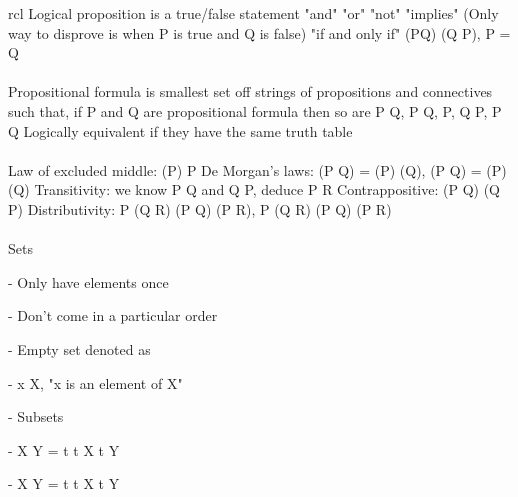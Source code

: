 \documentclass{article}
\begin{document}
\begin{arrary}{rcl}
Logical proposition is a true/false statement
\newline "and" \wedge
\newlilne "or" \vee
\newlline "not" \neg
\newline "implies" \Rightarrow (Only way to disprove is when P is true and Q is false)
\newlline "if and only if" \Leftrightarrow (P\Rightarrow Q) \wedge (Q \Rightarrow P), P = Q
\\
\\
Propositional formula is smallest set off strings of propositions and connectives such that, if P and Q are propositional formula then so are P \wedge Q, P \vee Q, \neg P, Q \Rightarrow P, P \Leftrightarrow Q
\newline Logically equivalent if they have the same truth table
\\
\\
Law of excluded middle: \neg (\neg P) \Leftrightarrow P
\newlilne De Morgan's laws: \neg (P \vee Q) = (\neg P) \wedge (\neg Q), \neg (P \wedge Q) = (\neg P) \vee (\neg Q)
\newline Transitivity: we know P \Rightarrow Q and Q \Rightarrow P, deduce P \Rightarrow R
\newline Contrappositive: (P \Rightarrow Q) \Rightarrow (\neg Q \Rightarrow \neg P)
\newline Distributivity: P \wedge (Q \vee R) \Leftrightarrow (P \wedge Q) \vee (P \wedge R), P \vee (Q \wedge R) \Leftrightarrow (P \vee Q) \wedge (P \vee R)
\\
\\
Sets {}

- Only have elements once

- Don't come in a particular order

- Empty set denoted as \varnothing

- x \in\) X, "x is an element of X"

- Subsets \subseteq

- X \cup Y = {t \vert t \in X \vee t \in Y}

- X \cap Y = {t \vert t \in X \wedge t \in Y}


\end{arrary}
\end{document}
